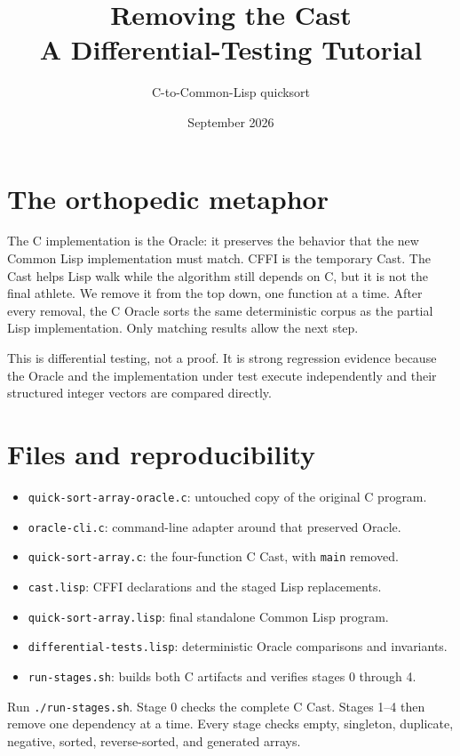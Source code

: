 \documentclass[fontsize=16pt]{scrartcl}
\title{Removing the Cast\\A Differential-Testing Tutorial}
\author{C-to-Common-Lisp quicksort}
\date{September 2026}
\begin{document}
\maketitle

\section*{The orthopedic metaphor}

The C implementation is the Oracle: it preserves the behavior that the new
Common Lisp implementation must match.  CFFI is the temporary Cast.  The Cast
helps Lisp walk while the algorithm still depends on C, but it is not the final
athlete.  We remove it from the top down, one function at a time.  After every
removal, the C Oracle sorts the same deterministic corpus as the partial Lisp
implementation.  Only matching results allow the next step.

This is differential testing, not a proof.  It is strong regression evidence
because the Oracle and the implementation under test execute independently and
their structured integer vectors are compared directly.

\section*{Files and reproducibility}

\begin{itemize}[leftmargin=*]
\item \texttt{quick-sort-array-oracle.c}: untouched copy of the original C program.
\item \texttt{oracle-cli.c}: command-line adapter around that preserved Oracle.
\item \texttt{quick-sort-array.c}: the four-function C Cast, with \texttt{main} removed.
\item \texttt{cast.lisp}: CFFI declarations and the staged Lisp replacements.
\item \texttt{quick-sort-array.lisp}: final standalone Common Lisp program.
\item \texttt{differential-tests.lisp}: deterministic Oracle comparisons and invariants.
\item \texttt{run-stages.sh}: builds both C artifacts and verifies stages 0 through 4.
\end{itemize}

Run \texttt{./run-stages.sh}.  Stage 0 checks the complete C Cast.  Stages 1--4
then remove one dependency at a time.  Every stage checks empty, singleton,
duplicate, negative, sorted, reverse-sorted, and generated arrays.
\end{document}
